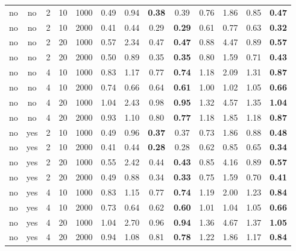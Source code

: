 \begin{tabular}{||cc||ccc||cccc||cccc||}
   \hline
\hline
no & no & 2 & 10 & 1000 & 0.49 & 0.94 & \bf 0.38 & 0.39 & 0.76 & 1.86 & 0.85 & \bf 0.47 \\
  no & no & 2 & 10 & 2000 & 0.41 & 0.44 & 0.29 & \bf 0.29 & 0.61 & 0.77 & 0.63 & \bf 0.32 \\
  no & no & 2 & 20 & 1000 & 0.57 & 2.34 & 0.47 & \bf 0.47 & 0.88 & 4.47 & 0.89 & \bf 0.57 \\
  no & no & 2 & 20 & 2000 & 0.50 & 0.89 & 0.35 & \bf 0.35 & 0.80 & 1.59 & 0.71 & \bf 0.43 \\
   \hline
no & no & 4 & 10 & 1000 & 0.83 & 1.17 & 0.77 & \bf 0.74 & 1.18 & 2.09 & 1.31 & \bf 0.87 \\
  no & no & 4 & 10 & 2000 & 0.74 & 0.66 & 0.64 & \bf 0.61 & 1.00 & 1.02 & 1.05 & \bf 0.66 \\
  no & no & 4 & 20 & 1000 & 1.04 & 2.43 & 0.98 & \bf 0.95 & 1.32 & 4.57 & 1.35 & \bf 1.04 \\
  no & no & 4 & 20 & 2000 & 0.93 & 1.10 & 0.80 & \bf 0.77 & 1.18 & 1.85 & 1.18 & \bf 0.87 \\
   \hline
no & yes & 2 & 10 & 1000 & 0.49 & 0.96 & \bf 0.37 & 0.37 & 0.73 & 1.86 & 0.88 & \bf 0.48 \\
  no & yes & 2 & 10 & 2000 & 0.41 & 0.44 & \bf 0.28 & 0.28 & 0.62 & 0.85 & 0.65 & \bf 0.34 \\
  no & yes & 2 & 20 & 1000 & 0.55 & 2.42 & 0.44 & \bf 0.43 & 0.85 & 4.16 & 0.89 & \bf 0.57 \\
  no & yes & 2 & 20 & 2000 & 0.49 & 0.88 & 0.34 & \bf 0.33 & 0.75 & 1.59 & 0.70 & \bf 0.41 \\
   \hline
no & yes & 4 & 10 & 1000 & 0.83 & 1.15 & 0.77 & \bf 0.74 & 1.19 & 2.00 & 1.23 & \bf 0.84 \\
  no & yes & 4 & 10 & 2000 & 0.73 & 0.64 & 0.62 & \bf 0.60 & 1.01 & 1.04 & 1.05 & \bf 0.66 \\
  no & yes & 4 & 20 & 1000 & 1.04 & 2.70 & 0.96 & \bf 0.94 & 1.36 & 4.67 & 1.37 & \bf 1.05 \\
  no & yes & 4 & 20 & 2000 & 0.94 & 1.08 & 0.81 & \bf 0.78 & 1.22 & 1.86 & 1.17 & \bf 0.84 \\
   \hline
\hline
\end{tabular}